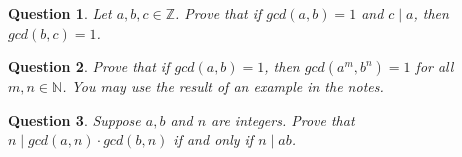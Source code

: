 \documentclass[11pt,oneside]{article}
\newtheorem{question}{Question}
\begin{document}
\bigskip

\begin{question}
	Let $a, b, c \in \mathbb{Z}$. Prove that if $gcd(a, b) = 1$ and $c \mid a$, then $gcd(b, c) = 1$.
\end{question}

\bigskip

\begin{question}
	Prove that if $gcd(a, b) = 1$, then $gcd(a^{m}, b^{n}) = 1$ for all $m, n \in \mathbb{N}$. You may use the result of an example in the notes.
\end{question}

\bigskip

\begin{question}
	Suppose $a, b$ and $n$ are integers. Prove that $n \mid gcd(a, n) \cdot gcd(b, n)$ if and only if $n \mid ab$.
\end{question}
\end{document}
